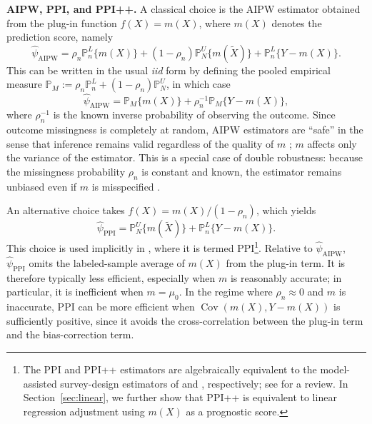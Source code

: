\documentclass{article}
\theoremstyle{plain}
\theoremstyle{definition}
\newcommand{\1}{\mathbbm{1}}
\newcommand{\rhon}{\rho_n}
\newcommand{\Pl}{\mathbb{P}^{L}_n}
\newcommand{\Pu}{\mathbb{P}^{U}_N}
\newcommand{\Cov}{\operatorname{Cov}}
\begin{document}
\textbf{AIPW, PPI, and PPI++.}
A classical choice is the AIPW estimator \citep{robins1995analysis} obtained from the plug-in function \(f(X)=m(X)\), where \(m(X)\) denotes the prediction score, namely
\[
\widehat{\psi}_{\mathrm{AIPW}}
=
\rhon \Pl\{m(X)\}
+
(1-\rhon)\Pu\{m(\widetilde X)\}
+
\Pl\{Y-m(X)\}.
\]
This can be written in the usual \textit{iid} form by defining the pooled empirical measure \(\mathbb{P}_{M}:=\rhon \Pl + (1-\rhon)\Pu\), in which case
\[
\widehat{\psi}_{\mathrm{AIPW}}
=
\mathbb{P}_{M}\{m(X)\}
+
\rhon^{-1}\mathbb{P}_{M}\{Y-m(X)\},
\]
where \(\rhon^{-1}\) is the known inverse probability of observing the outcome. Since outcome missingness is completely at random, AIPW estimators are ``safe'' in the sense that inference remains valid regardless of the quality of \(m\) \citep{xu2025unified}; \(m\) affects only the variance of the estimator. This is a special case of double robustness: because the missingness probability \(\rho_n\) is constant and known, the estimator remains unbiased even if \(m\) is misspecified \citep{bang2005doubly}.

An alternative choice takes \(f(X)=m(X)/(1-\rho_n)\), which yields
\[
\widehat{\psi}_{\mathrm{PPI}}
=
\Pu\{m(\widetilde X)\}+\Pl\{Y-m(X)\}.
\]
This choice is used implicitly in \citet{ppi2023}, where it is termed PPI\footnote{The PPI and PPI++ estimators are algebraically equivalent to the model-assisted survey-design estimators of \citet{cassel1976some} and \citet{sarndal2003model}, respectively; see \citet{mozer2026ppi} for a review. In Section~\ref{sec:linear}, we further show that PPI++ is equivalent to linear regression adjustment using \(m(X)\) as a prognostic score.}. Relative to \(\widehat{\psi}_{\mathrm{AIPW}}\), \(\widehat{\psi}_{\mathrm{PPI}}\) omits the labeled-sample average of \(m(X)\) from the plug-in term. It is therefore typically less efficient, especially when \(m\) is reasonably accurate; in particular, it is inefficient when \(m=\mu_0\). In the regime where \(\rho_n \approx 0\) and \(m\) is inaccurate, PPI can be more efficient when \(\Cov(m(X), Y-m(X))\) is sufficiently positive, since it avoids the cross-correlation between the plug-in term and the bias-correction term.

 
\end{document}
